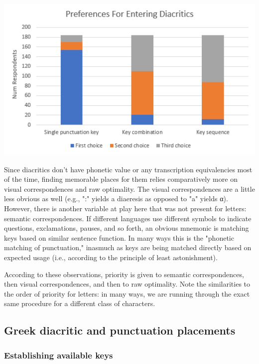 \documentclass[11pt]{article}
\begin{document}
\begin{center}
\includegraphics[width=.9\linewidth]{./images/diacritic-entry-preferences.PNG}
\end{center}

Since diacritics don't have phonetic value or any transcription equivalencies most of the time, finding memorable places for them relies comparatively more on visual correspondences and raw optimality. The visual correspondences are a little less obvious as well (e.g., ":" yields a diaeresis as opposed to "a" yields α). However, there is another variable at play here that was not present for letters: semantic correspondences. If different languages use different symbols to indicate questions, exclamations, pauses, and so forth, an obvious mnemonic is matching keys based on similar sentence function. In many ways this is the "phonetic matching of punctuation," inasmuch as keys are being matched directly based on expected usage (i.e., according to the principle of least astonishment).

According to these observations, priority is given to semantic correspondences, then visual correspondences, and then to raw optimality. Note the similarities to the order of priority for letters: in many ways, we are running through the exact same procedure for a different class of characters.

\subsection{Greek diacritic and punctuation placements}
\label{sec:orgf8a2889}

\subsubsection{Establishing available keys}
\label{sec:orgd4aa88d}
\end{document}
